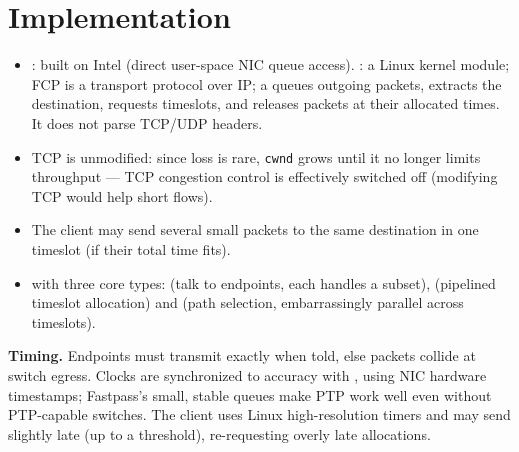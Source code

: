 \section{Implementation}
\begin{itemize}
\item {}: built on Intel  (direct user-space NIC queue access). : a Linux kernel module; FCP is a transport protocol over IP; a  queues outgoing packets, extracts the destination, requests timeslots, and releases packets at their allocated times. It does not parse TCP/UDP headers.
\item TCP is unmodified: since loss is rare, \texttt{cwnd} grows until it no longer limits throughput --- TCP congestion control is effectively switched off (modifying TCP would help short flows).
\item The client may send several small packets to the same destination in one timeslot (if their total time fits).
\item {} with three core types:  (talk to endpoints, each handles a subset),  (pipelined timeslot allocation) and  (path selection, embarrassingly parallel across timeslots).
\end{itemize}
\textbf{Timing.} Endpoints must transmit exactly when told, else packets collide at switch egress. Clocks are synchronized to  accuracy with , using NIC hardware timestamps; Fastpass's small, stable queues make PTP work well even without PTP-capable switches. The client uses Linux high-resolution timers and may send slightly late (up to a threshold), re-requesting overly late allocations.

